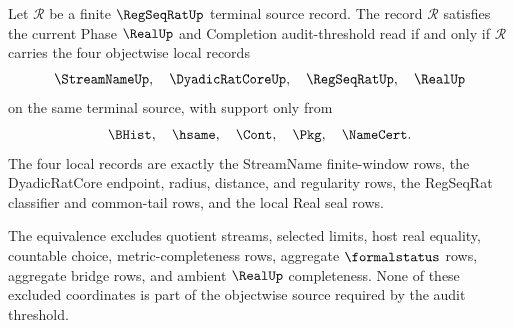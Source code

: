 \begin{theorem}
\label{thm:regseqrat-audit-threshold-objectwise-face-necessity}
Let $\mathcal R$ be a finite $\RegSeqRatUp$ terminal source record. The record $\mathcal R$ satisfies the current Phase $\RealUp$ and Completion audit-threshold read if and only if $\mathcal R$ carries the four objectwise local records
$$
\StreamNameUp,\quad \DyadicRatCoreUp,\quad \RegSeqRatUp,\quad \RealUp
$$
on the same terminal source, with support only from
$$
\BHist,\quad \hsame,\quad \Cont,\quad \Pkg,\quad \NameCert.
$$
The four local records are exactly the StreamName finite-window rows, the DyadicRatCore endpoint, radius, distance, and regularity rows, the RegSeqRat classifier and common-tail rows, and the local Real seal rows.

The equivalence excludes quotient streams, selected limits, host real equality, countable choice, metric-completeness rows, aggregate $\formalstatus$ rows, aggregate bridge rows, and ambient $\RealUp$ completeness. None of these excluded coordinates is part of the objectwise source required by the audit threshold.
\end{theorem}
